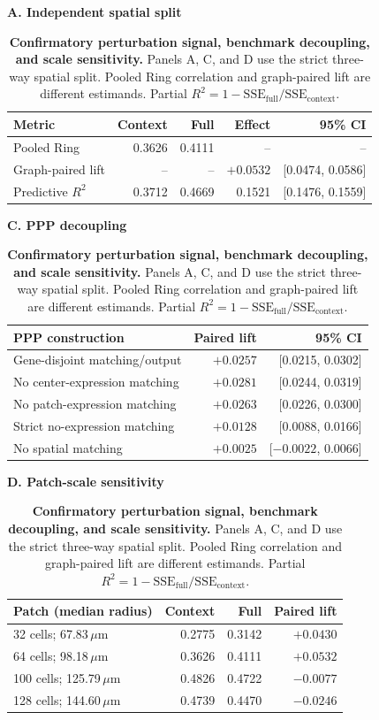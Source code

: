 \documentclass[sigconf,review,balance=false]{acmart}
\begin{document}
\begin{table}[t]
\centering
\caption{\textbf{Confirmatory perturbation signal, benchmark decoupling, and
scale sensitivity.}
Panels A, C, and D use the strict three-way spatial split. Pooled Ring
correlation and graph-paired lift are different estimands. Partial
$R^2=1-\mathrm{SSE}_{\mathrm{full}}/\mathrm{SSE}_{\mathrm{context}}$.}
\label{tab:confirmatory_analysis}
\vspace{2pt}
\footnotesize
\setlength{\tabcolsep}{1.0pt}
\renewcommand{\arraystretch}{1.03}
\textbf{A. Independent spatial split}
\vspace{1pt}
\begin{tabular*}{\columnwidth}{@{\extracolsep{\fill}}lrrrr@{}}
\toprule
Metric & Context & Full & Effect & 95\% CI \\
\midrule
Pooled Ring & 0.3626 & 0.4111 & -- & -- \\
Graph-paired lift & -- & -- & $+0.0532$ & [0.0474, 0.0586] \\
Predictive $R^2$ & 0.3712 & 0.4669 & 0.1521 & [0.1476, 0.1559] \\
\bottomrule
\end{tabular*}
\vspace{5pt}

\textbf{C. PPP decoupling}
\vspace{1pt}
\begin{tabular*}{\columnwidth}{@{\extracolsep{\fill}}lrr@{}}
\toprule
PPP construction & Paired lift & 95\% CI \\
\midrule
Gene-disjoint matching/output & $+0.0257$ & [0.0215, 0.0302] \\
No center-expression matching & $+0.0281$ & [0.0244, 0.0319] \\
No patch-expression matching & $+0.0263$ & [0.0226, 0.0300] \\
Strict no-expression matching & $+0.0128$ & [0.0088, 0.0166] \\
No spatial matching & $+0.0025$ & [$-0.0022$, 0.0066] \\
\bottomrule
\end{tabular*}
\vspace{5pt}

\textbf{D. Patch-scale sensitivity}
\vspace{1pt}
\begin{tabular*}{\columnwidth}{@{\extracolsep{\fill}}lrrr@{}}
\toprule
Patch (median radius) & Context & Full & Paired lift \\
\midrule
32 cells; 67.83\,$\mu$m & 0.2775 & 0.3142 & $+0.0430$ \\
64 cells; 98.18\,$\mu$m & 0.3626 & 0.4111 & $+0.0532$ \\
100 cells; 125.79\,$\mu$m & 0.4826 & 0.4722 & $-0.0077$ \\
128 cells; 144.60\,$\mu$m & 0.4739 & 0.4470 & $-0.0246$ \\
\bottomrule
\end{tabular*}
\end{table}
\end{document}
